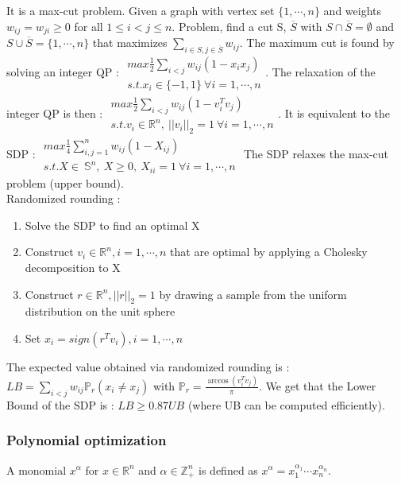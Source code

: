 \documentclass[../main.tex]{subfiles}
\begin{document}
It is a max-cut problem. Given a graph with vertex set $\{1, \cdots, n\}$ and weights $w_{ij} = w_{ji} \geq 0$ for all $1\leq i < j \leq n$. Problem, find a cut S, $\overline{S}$ with $S \cap \overline{S} = \emptyset$ and $S \cup \overline{S} = \{1, \cdots, n\}$ that maximizes $\sum_{i\in S, j\in \overline{S}} w_{ij}$. The maximum cut is found by solving an integer QP : $\begin{matrix}
    max \frac{1}{2} \sum_{i<j} w_{ij} (1-x_ix_j)\\
    s.t. x_i \in \{-1,1\}\: \forall i=1,\cdots, n
\end{matrix}$. The relaxation of the integer QP is then : $\begin{matrix}
    max \frac{1}{2} \sum_{i<j} w_{ij} (1-v_i^Tv_j)\\
    s.t. v_i \in \mathbb{R}^n,\: \lvert\lvert v_i\rvert\rvert_2 = 1 \: \forall i=1,\cdots, n
\end{matrix}$. It is equivalent to the SDP : $\begin{matrix}
    max \frac{1}{4} \sum_{i,j=1}^n w_{ij} (1- X_{ij})\\
    s.t. X \in \: \mathbb{S}^n, \: X \geq 0, \: X_{ii} = 1 \: \forall i=1, \cdots, n
\end{matrix}$ The SDP relaxes the max-cut problem (upper bound). \\
Randomized rounding : \begin{enumerate}
    \item Solve the SDP to find an optimal X
    \item Construct $v_i \in \mathbb{R}^n, i=1, \cdots, n$ that are optimal by applying a Cholesky decomposition to X
    \item Construct $r\in \mathbb{R}^n, \lvert\lvert r\rvert\rvert_2 = 1$ by drawing a sample from the uniform distribution on the unit sphere
    \item Set $x_i = sign(r^Tv_i), i=1,\cdots,n$
\end{enumerate}
The expected value obtained via randomized rounding is : $LB = \sum_{i<j} w_{ij} \mathbb{P}_r (x_i \neq x_j)$ with $\mathbb{P}_r = \frac{\arccos(v_i^Tv_j)}{\pi}$. We get that the Lower Bound of the SDP is : $LB \geq 0.87 UB$ (where UB can be computed efficiently).\\

\subsubsection{Polynomial optimization}
\begin{theorem}
    A monomial $x^\alpha$ for $x\in \mathbb{R}^n$ and $\alpha \in \mathbb{Z}_+^n$ is defined as $x^\alpha = x_1^{\alpha_1} \cdots x_n^{\alpha_n}$. 
\end{theorem}
\end{document}
